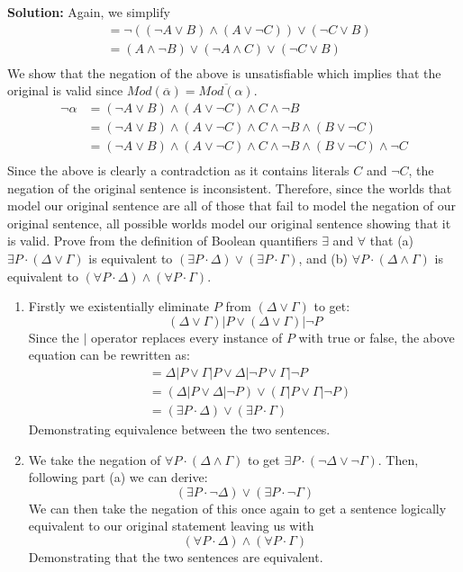 \documentclass[11pt]{exam}
\begin{document}
\begin{questions}
\textbf{Solution:} Again, we simplify
\begin{align*}
&= \neg((\neg A \lor B) \land (A \lor \neg C)) \lor (\neg C \lor B)\\
&= (A \land \lnot B) \lor (\neg A \land C) \lor (\neg C \lor B)\\
\end{align*}
We show that the negation of the above is unsatisfiable which implies that the original is valid since $Mod(\overline{\alpha}) = \overline{ Mod(\alpha)}$.
\begin{align*}
\neg \alpha &= (\neg A \lor B) \land (A \lor \neg C) \land C \land \neg B\\
&= (\neg A \lor B) \land (A \lor \neg C) \land C \land \neg B \land (B \lor \lnot C)\\
&= (\neg A \lor B) \land (A \lor \neg C) \land C \land \neg B \land (B \lor \neg C) \land \neg C\\
\end{align*}
Since the above is clearly a contradction as it contains literals $C$ and $\neg C$, the negation of the original sentence is inconsistent. Therefore, since the worlds that model our original sentence are all of those that fail to model the negation of our original sentence, all possible worlds model our original sentence showing that it is valid.
\newpage
\question[8] Prove from the definition of Boolean quantifiers $\exists$ and $\forall$ that (a) $\exists P \cdot (\Delta \lor \Gamma)$ is equivalent to $(\exists P \cdot \Delta) \lor (\exists P \cdot \Gamma)$, and (b) $\forall P \cdot (\Delta \land \Gamma)$ is equivalent to $(\forall P \cdot \Delta) \land (\forall P \cdot \Gamma)$. 
\begin{enumerate}[label=(\alph*)]
    \item Firstly we existentially eliminate $P$ from $(\Delta \lor \Gamma)$ to get: $$(\Delta \lor \Gamma) | P \lor (\Delta \lor \Gamma) | \lnot P$$Since the $|$ operator replaces every instance of $P$ with true or false, the above equation can be rewritten as:\begin{align*}
    &= \Delta | P \lor \Gamma | P \lor \Delta | \lnot P \lor \Gamma | \lnot P\\
    &= (\Delta | P \lor \Delta | \lnot P) \lor (\Gamma | P \lor \Gamma | \lnot P)\\
    &= (\exists P \cdot \Delta) \lor (\exists P \cdot \Gamma)
    \end{align*}
    Demonstrating equivalence between the two sentences.
    \item We take the negation of $\forall P \cdot (\Delta \land \Gamma)$ to get $\exists P \cdot (\lnot \Delta \lor \lnot \Gamma)$. Then, following part (a) we can derive:
    $$
    (\exists P \cdot \lnot \Delta) \lor (\exists P \cdot \lnot \Gamma)
    $$
    We can then take the negation of this once again to get a sentence logically equivalent to our original statement leaving us with
    $$(\forall P \cdot \Delta) \land (\forall P \cdot \Gamma)$$
    Demonstrating that the two sentences are equivalent.
\end{enumerate}


\end{questions}
\end{document}
